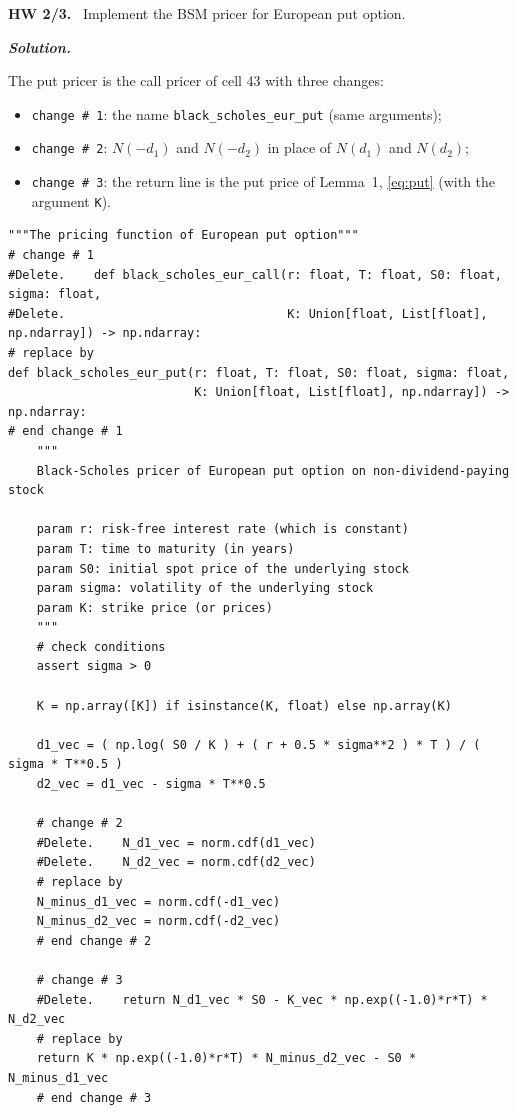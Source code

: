 \documentclass[11pt,a4paper]{article}
\newenvironment{exercise}[1]{\par\medskip\noindent\textbf{#1.}\ }{\par\medskip}
\newcommand{\solution}{\par\noindent\textbf{\textit{Solution.}}\ }
\newcommand{\subhead}[1]{\par\medskip\noindent{\large\bfseries #1}\par\smallskip\noindent\ignorespaces}
\begin{document}
\begin{exercise}{HW 2/3}
Implement the BSM pricer for European put option.
\end{exercise}
\solution
\subhead{New version.} The put pricer is the call pricer of cell 43 with three changes:
\begin{itemize}
\item \texttt{change \# 1}: the name \texttt{black\_scholes\_eur\_put} (same arguments);
\item \texttt{change \# 2}: $N(-d_1)$ and $N(-d_2)$ in place of $N(d_1)$ and $N(d_2)$;
\item \texttt{change \# 3}: the return line is the put price of Lemma~1, \eqref{eq:put} (with the argument \texttt{K}).
\end{itemize}
\par\smallskip\noindent\begin{minipage}{\linewidth}\begin{lstlisting}[style=prof,title={the put pricer}]
"""The pricing function of European put option"""
# change # 1
#Delete.    def black_scholes_eur_call(r: float, T: float, S0: float, sigma: float,
#Delete.                               K: Union[float, List[float], np.ndarray]) -> np.ndarray:
# replace by
def black_scholes_eur_put(r: float, T: float, S0: float, sigma: float,
                          K: Union[float, List[float], np.ndarray]) -> np.ndarray:
# end change # 1
    """
    Black-Scholes pricer of European put option on non-dividend-paying stock

    param r: risk-free interest rate (which is constant)
    param T: time to maturity (in years)
    param S0: initial spot price of the underlying stock
    param sigma: volatility of the underlying stock
    param K: strike price (or prices)
    """
    # check conditions
    assert sigma > 0

    K = np.array([K]) if isinstance(K, float) else np.array(K)

    d1_vec = ( np.log( S0 / K ) + ( r + 0.5 * sigma**2 ) * T ) / ( sigma * T**0.5 )
    d2_vec = d1_vec - sigma * T**0.5

    # change # 2
    #Delete.    N_d1_vec = norm.cdf(d1_vec)
    #Delete.    N_d2_vec = norm.cdf(d2_vec)
    # replace by
    N_minus_d1_vec = norm.cdf(-d1_vec)
    N_minus_d2_vec = norm.cdf(-d2_vec)
    # end change # 2

    # change # 3
    #Delete.    return N_d1_vec * S0 - K_vec * np.exp((-1.0)*r*T) * N_d2_vec
    # replace by
    return K * np.exp((-1.0)*r*T) * N_minus_d2_vec - S0 * N_minus_d1_vec
    # end change # 3
\end{lstlisting}\end{minipage}\par\smallskip
\end{document}

